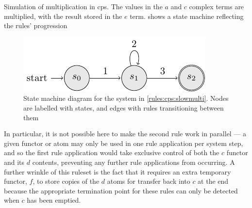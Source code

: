 \begin{cprulesetfloat}
    \begin{cpruleset}
        
    
    \end{cpruleset}
    \caption[Simulation of multiplication in cP systems]{\label{rules:cps:slowmulti}Simulation of multiplication in \gls{cps}.  The values in the \(a\) and \(c\) complex terms are multiplied, with the result stored in the \(e\) term.   shows a state machine reflecting the rules' progression}
\end{cprulesetfloat}

\begin{figure}
    \centering
    \includegraphics{chapters/cpsystems/ruleset1statemachine.pdf}
    \caption[State machine diagram for the system in \cref{rules:cps:slowmulti}]{State machine diagram for the system in \cref{rules:cps:slowmulti}.  Nodes are labelled with states, and edges with rules transitioning between them}
    \label{fig:cps:slowmulti}
\end{figure}

In particular, it is not possible here to make the second rule work in parallel --- a given functor or atom may only be used in one rule application per system step, and so the first rule application would take exclusive control of both the \(c\) functor and its \(d\) contents, preventing any further rule applications from occurring.  A further wrinkle of this \gls{ruleset} is the fact that it requires an extra temporary functor, \(f\), to store copies of the \(d\) atoms for transfer back into \(c\) at the end because the appropriate termination point for these rules can only be detected when \(c\) has been emptied.

